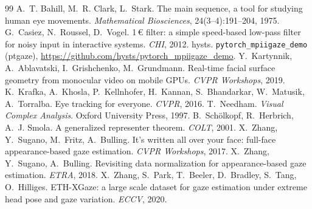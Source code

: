 \documentclass[10pt,a4paper]{article}
\begin{document}
\begin{thebibliography}{99}
 A.~T. Bahill, M.~R. Clark, L.~Stark. The main sequence, a tool for studying human eye movements. \emph{Mathematical Biosciences}, 24(3--4):191--204, 1975.
 G.~Casiez, N.~Roussel, D.~Vogel. 1\,€ filter: a simple speed-based low-pass filter for noisy input in interactive systems. \emph{CHI}, 2012.
 hysts. \texttt{pytorch\_mpiigaze\_demo} (ptgaze), \url{https://github.com/hysts/pytorch_mpiigaze_demo}.
 Y.~Kartynnik, A.~Ablavatski, I.~Grishchenko, M.~Grundmann. Real-time facial surface geometry from monocular video on mobile GPUs. \emph{CVPR Workshops}, 2019.
 K.~Krafka, A.~Khosla, P.~Kellnhofer, H.~Kannan, S.~Bhandarkar, W.~Matusik, A.~Torralba. Eye tracking for everyone. \emph{CVPR}, 2016.
 T.~Needham. \emph{Visual Complex Analysis}. Oxford University Press, 1997.
 B.~Schölkopf, R.~Herbrich, A.~J. Smola. A generalized representer theorem. \emph{COLT}, 2001.
 X.~Zhang, Y.~Sugano, M.~Fritz, A.~Bulling. It's written all over your face: full-face appearance-based gaze estimation. \emph{CVPR Workshops}, 2017.
 X.~Zhang, Y.~Sugano, A.~Bulling. Revisiting data normalization for appearance-based gaze estimation. \emph{ETRA}, 2018.
 X.~Zhang, S.~Park, T.~Beeler, D.~Bradley, S.~Tang, O.~Hilliges. ETH-XGaze: a large scale dataset for gaze estimation under extreme head pose and gaze variation. \emph{ECCV}, 2020.
\end{thebibliography}
\end{document}
